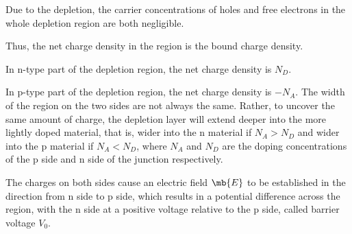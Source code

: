 \documentclass[a4paper,12pt]{article}
\begin{document}
Due to the depletion, the carrier concentrations of holes and free electrons in the whole depletion region are both negligible.

Thus, the net charge density in the region is the bound charge density.
\bit
\item In n-type part of the depletion region, the net charge density is $N_D$.
\item In p-type part of the depletion region, the net charge density is $-N_A$.
\eit
The width of the region on the two sides are not always the same. Rather, to uncover the same amount of charge, the depletion layer will extend deeper into the more lightly doped material, that is, wider into the n material if $N_A>N_D$ and wider into the p material if $N_A<N_D$, where $N_A$ and $N_D$ are the doping concentrations of the p side and n side of the junction respectively.

The charges on both sides cause an electric field $\mb{E}$ to be established in the direction from n side to p side, which results in a potential difference across the region, with the n side at a positive voltage relative to the p side, called barrier voltage $V_0$.
\end{document}

